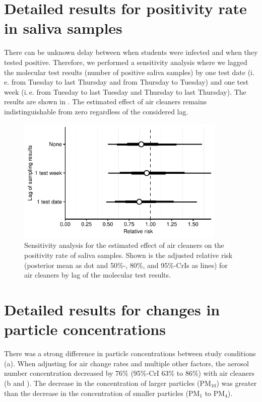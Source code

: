 \documentclass[fleqn,11pt]{wlscirep_supp}
\newcommand\ie{i.\,e.\xspace}
\begin{document}
\clearpage

\section{Detailed results for positivity rate in saliva samples}
\label{sec:detailed-molecular}

There can be unknown delay between when students were infected and when they tested positive. Therefore, we performed a sensitivity analysis where we lagged the molecular test results (number of positive saliva samples) by one test date (\ie from Tuesday to last Thursday and from Thursday to Tuesday) and one test week (\ie from Tuesday to last Tuesday and Thursday to last Thursday). The results are shown in . The estimated effect of air cleaners remains indistinguishable from zero regardless of the considered lag.  

\begin{figure}[!htb]
\centering
    \includegraphics[width=10cm]{../../results/mol-data/model-results.pdf}
    \caption[Sensitivity analysis for the estimated effect of air cleaners on the positivity rate of saliva samples]{Sensitivity analysis for the estimated effect of air cleaners on the positivity rate of saliva samples. Shown is the adjusted relative risk (posterior mean as dot and 50\%-, 80\%, and 95\%-CrIs as lines) for air cleaners by lag of the molecular test results.}
    \label{fig:mol-estimation-results-sensitivity}
\end{figure}

\clearpage

\section{Detailed results for changes in particle concentrations}\label{sec:detailed-palas}

There was a strong difference in particle concentrations between study conditions (a). When adjusting for air change rates and multiple other factors, the aerosol number concentration decreased by 76\% (95\%-CrI 63\% to 86\%) with air cleaners (b and ). The decrease in the concentration of larger particles (PM$_{10}$) was greater than the decrease in the concentration of smaller particles (PM$_1$ to PM$_{4}$). 
\end{document}
